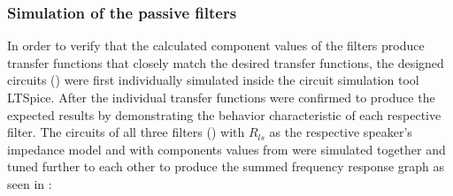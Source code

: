 \subsubsection{Simulation of the passive filters}
In order to verify that the calculated component values of the filters produce transfer functions that closely match the desired transfer functions, the designed circuits () were first individually simulated inside the circuit simulation tool LTSpice. After the individual transfer functions were confirmed to produce the expected results by demonstrating the behavior characteristic of each respective filter. The circuits of all three filters () with \(R_{ls}\) as the respective speaker's impedance model and with components values from  were simulated together and tuned further to each other to produce the summed frequency response graph as seen in
:
